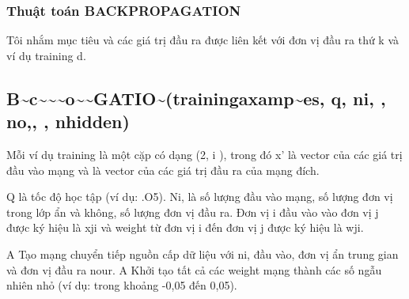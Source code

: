 \subsubsection{Thuật toán BACKPROPAGATION}

Tôi nhắm mục tiêu và các giá trị đầu ra được liên kết với đơn vị đầu ra thứ k và ví dụ training d.

\subsection{B\textasciitilde{}c\textasciitilde{}\textasciitilde{}\textasciitilde{}o\textasciitilde{}\textasciitilde{}GATIO\textasciitilde{}(trainingaxamp\textasciitilde{}es, q, ni, , no,, , nhidden)}

Mỗi ví dụ training là một cặp có dạng (2, i ), trong đó x' là vector của các giá trị đầu vào mạng và là vector của các giá trị đầu ra của mạng đích.

Q là tốc độ học tập (ví dụ: .O5). Ni, là số lượng đầu vào mạng, số lượng đơn vị trong lớp ẩn và không, số lượng đơn vị đầu ra. Đơn vị i đầu vào vào đơn vị j được ký hiệu là xji và weight từ đơn vị i đến đơn vị j được ký hiệu là wji.

A Tạo mạng chuyển tiếp nguồn cấp dữ liệu với ni, đầu vào, đơn vị ẩn trung gian và đơn vị đầu ra nour. A Khởi tạo tất cả các weight mạng thành các số ngẫu nhiên nhỏ (ví dụ: trong khoảng -0,05 đến 0,05).

